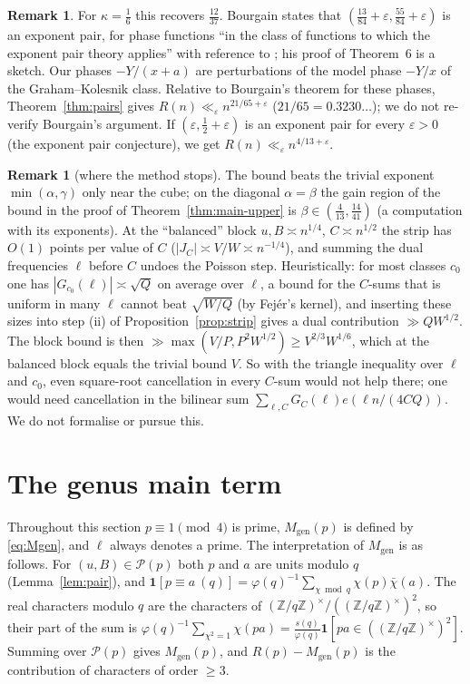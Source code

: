 \documentclass[11pt,reqno]{amsart}
\theoremstyle{definition}
\newtheorem{remark}[theorem]{Remark}
\newcommand{\Z}{\mathbb Z}
\newcommand{\eps}{\varepsilon}
\newcommand{\cP}{\mathcal P}
\newcommand{\Mgen}{M_{\mathrm{gen}}}
\begin{document}
\begin{remark}\label{rem:bourgain}
For $\kappa=\frac16$ this recovers $\frac{12}{37}$.  Bourgain
\cite[Thm.~6]{Bourgain} states that $(\frac{13}{84}+\eps,\frac{55}{84}+\eps)$
is an exponent pair, for phase functions ``in the class of functions to
which the exponent pair theory applies'' with reference to
\cite[Ch.~3]{GK}; his proof of Theorem~6 is a sketch.  Our phases
$-Y/(x+a)$ are perturbations of the model phase $-Y/x$ of the
Graham--Kolesnik class.  Relative to Bourgain's theorem for these
phases, Theorem~\ref{thm:pairs} gives $R(n)\ll_\eps n^{21/65+\eps}$
($21/65=0.3230\ldots$); we do not re-verify Bourgain's argument.  If
$(\eps,\frac12+\eps)$ is an exponent pair for every $\eps>0$ (the
exponent pair conjecture), we get $R(n)\ll_\eps n^{4/13+\eps}$.
\end{remark}

\begin{remark}[where the method stops]\label{rem:balanced}
The bound beats the trivial exponent $\min(\alpha,\gamma)$ only near the
cube; on the diagonal $\alpha=\beta$ the gain region of the bound in
the proof of Theorem~\ref{thm:main-upper} is
$\beta\in(\frac4{13},\frac{14}{41})$ (a computation with its exponents).  At the ``balanced'' block
$u,B\asymp n^{1/4}$, $C\asymp n^{1/2}$ the strip has $O(1)$ points per
value of $C$ ($|J_C|\asymp V/W\asymp n^{-1/4}$), and summing the dual
frequencies $\ell$ before $C$ undoes the Poisson step.  Heuristically:
for most classes $c_0$ one has $|G_{c_0}(\ell)|\asymp\sqrt Q$ on average
over $\ell$, a bound for the $C$-sums that is uniform in many $\ell$
cannot beat $\sqrt{W/Q}$ (by Fej\'er's kernel), and inserting these sizes
into step (ii) of Proposition~\ref{prop:strip} gives a dual contribution
$\gg QW^{1/2}$.  The block bound is then $\gg\max(V/P,P^2W^{1/2})\ge
V^{2/3}W^{1/6}$, which at the balanced block equals the trivial bound
$V$.  So with the triangle inequality over $\ell$ and $c_0$, even
square-root cancellation in every $C$-sum would not help there; one
would need cancellation in the bilinear sum
$\sum_{\ell,C}G_C(\ell)e(\ell n/(4CQ))$.  We do not formalise or pursue
this.
\end{remark}

\section{The genus main term}\label{sec:genus}

Throughout this section $p\equiv1\pmod4$ is prime, $\Mgen(p)$ is
defined by \eqref{eq:Mgen}, and $\ell$ always denotes a prime.  The interpretation of $\Mgen$ is as
follows.  For $(u,B)\in\cP(p)$ both $p$ and $a$ are units modulo $q$
(Lemma~\ref{lem:pair}), and
$\mathbf 1[p\equiv a\ (q)]=\varphi(q)^{-1}\sum_{\chi\bmod q}\chi(p)\bar\chi(a)$.
The real characters modulo $q$ are the characters of
$(\Z/q\Z)^\times/((\Z/q\Z)^\times)^2$, so their part of the sum is
$\varphi(q)^{-1}\sum_{\chi^2=1}\chi(pa)=\frac{s(q)}{\varphi(q)}\mathbf
1[pa\in((\Z/q\Z)^\times)^2]$.  Summing over $\cP(p)$ gives $\Mgen(p)$,
and $R(p)-\Mgen(p)$ is the contribution of characters of order $\ge3$.
\end{document}
